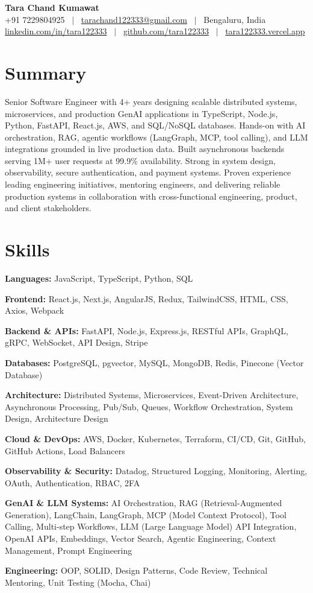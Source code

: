 \documentclass[letterpaper,10pt]{article}
\newcommand{\skillrow}[2]{\textbf{#1:} #2 \par\vspace{2pt}}
\begin{document}
\begin{center}
  {\Huge\bfseries Tara Chand Kumawat} \\[6pt]
  \small
  +91 7229804925 \ $|$ \
  \href{mailto:tarachand122333@gmail.com}{tarachand122333@gmail.com} \ $|$ \
  Bengaluru, India \\[2pt]
  \href{https://linkedin.com/in/tara122333}{linkedin.com/in/tara122333} \ $|$ \
  \href{https://github.com/tara122333}{github.com/tara122333} \ $|$ \
  \href{https://tara122333.vercel.app/}{tara122333.vercel.app}
\end{center}

\section{Summary}
Senior Software Engineer with 4+ years designing scalable distributed systems, microservices, and
production GenAI applications in TypeScript, Node.js, Python, FastAPI, React.js, AWS, and SQL/NoSQL
databases. Hands-on with AI orchestration, RAG, agentic workflows (LangGraph, MCP, tool calling), and LLM
integrations grounded in live production data. Built asynchronous backends serving 1M+ user requests at 99.9\%
availability. Strong in system design, observability, secure authentication, and payment systems. Proven
experience leading engineering initiatives, mentoring engineers, and delivering reliable production systems
in collaboration with cross-functional engineering, product, and client stakeholders.
\section{Skills}
\skillrow{Languages}{JavaScript, TypeScript, Python, SQL}
\skillrow{Frontend}{React.js, Next.js, AngularJS, Redux, TailwindCSS, HTML, CSS, Axios, Webpack}
\skillrow{Backend \& APIs}{FastAPI, Node.js, Express.js, RESTful APIs, GraphQL, gRPC, WebSocket, API Design, Stripe}
\skillrow{Databases}{PostgreSQL, pgvector, MySQL, MongoDB, Redis, Pinecone (Vector Database)}
\skillrow{Architecture}{Distributed Systems, Microservices, Event-Driven Architecture, Asynchronous Processing, Pub/Sub, Queues, Workflow Orchestration, System Design, Architecture Design}
\skillrow{Cloud \& DevOps}{AWS, Docker, Kubernetes, Terraform, CI/CD, Git, GitHub, GitHub Actions, Load Balancers}
\skillrow{Observability \& Security}{Datadog, Structured Logging, Monitoring, Alerting, OAuth, Authentication, RBAC, 2FA}
\skillrow{GenAI \& LLM Systems}{AI Orchestration, RAG (Retrieval-Augmented Generation), LangChain, LangGraph, MCP (Model Context Protocol), Tool Calling, Multi-step Workflows, LLM (Large Language Model) API Integration, OpenAI APIs, Embeddings, Vector Search, Agentic Engineering, Context Management, Prompt Engineering}
\skillrow{Engineering}{OOP, SOLID, Design Patterns, Code Review, Technical Mentoring, Unit Testing (Mocha, Chai)}
\end{document}
